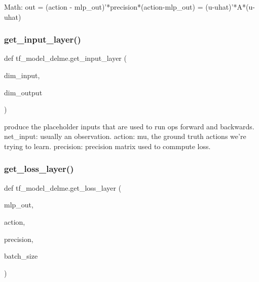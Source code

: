 \begin{DoxyVerb}Math:  out = (action - mlp_out)'*precision*(action-mlp_out)
                = (u-uhat)'*A*(u-uhat)\end{DoxyVerb}
 \hypertarget{namespacetf__model__delme_a0f397474eac4969ef271c649ca83ddeb}{}\label{namespacetf__model__delme_a0f397474eac4969ef271c649ca83ddeb} 
\subsubsection{\texorpdfstring{get\+\_\+input\+\_\+layer()}{get\_input\_layer()}}
{\footnotesize\ttfamily def tf\+\_\+model\+\_\+delme.\+get\+\_\+input\+\_\+layer (\begin{DoxyParamCaption}\item[{}]{dim\+\_\+input,  }\item[{}]{dim\+\_\+output }\end{DoxyParamCaption})}

\begin{DoxyVerb}produce the placeholder inputs that are used to run ops forward and backwards.
    net_input: usually an observation.
    action: mu, the ground truth actions we're trying to learn.
    precision: precision matrix used to commpute loss.\end{DoxyVerb}
 \hypertarget{namespacetf__model__delme_a120bac7a9b2da59e3b4d963751308e6d}{}\label{namespacetf__model__delme_a120bac7a9b2da59e3b4d963751308e6d} 
\subsubsection{\texorpdfstring{get\+\_\+loss\+\_\+layer()}{get\_loss\_layer()}}
{\footnotesize\ttfamily def tf\+\_\+model\+\_\+delme.\+get\+\_\+loss\+\_\+layer (\begin{DoxyParamCaption}\item[{}]{mlp\+\_\+out,  }\item[{}]{action,  }\item[{}]{precision,  }\item[{}]{batch\+\_\+size }\end{DoxyParamCaption})}

